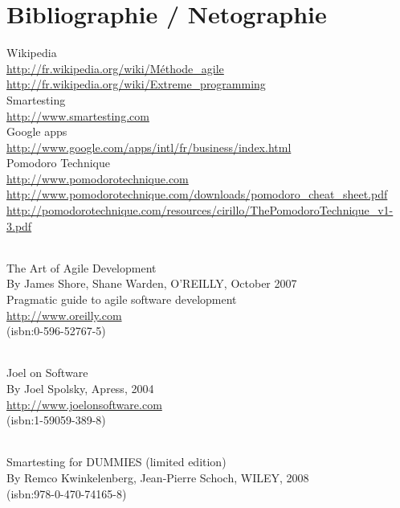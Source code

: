 \chapter{Bibliographie / Netographie}

Wikipedia\\
\url{http://fr.wikipedia.org/wiki/Méthode_agile}\\
\url{http://fr.wikipedia.org/wiki/Extreme_programming}\\

Smartesting\\
\url{http://www.smartesting.com}\\

Google apps\\
\url{http://www.google.com/apps/intl/fr/business/index.html}\\

Pomodoro Technique\\
\url{http://www.pomodorotechnique.com}\\
\url{http://www.pomodorotechnique.com/downloads/pomodoro_cheat_sheet.pdf}\\
\url{http://pomodorotechnique.com/resources/cirillo/ThePomodoroTechnique_v1-3.pdf}



\subparagraph*{}
The Art of Agile Development \\
By James Shore, Shane Warden, O'REILLY, October 2007\\
Pragmatic guide to agile software development\\
\url{http://www.oreilly.com}\\
(isbn:0-596-52767-5)

\subparagraph*{}
Joel on Software\\
By Joel Spolsky, Apress, 2004\\
\url{http://www.joelonsoftware.com}\\
(isbn:1-59059-389-8)

\subparagraph*{}
Smartesting for DUMMIES (limited edition)\\
By Remco Kwinkelenberg, Jean-Pierre Schoch, WILEY, 2008\\
(isbn:978-0-470-74165-8)
